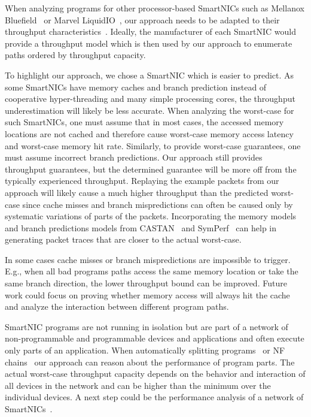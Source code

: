 \documentclass[sigconf,screen,authordraft]{acmart}
\newcommand{\Eg}{E.g.,}
\newcommand{\afblock}[1]{\noindent{\textbf{#1.}}}
\begin{document}
\afblock{Other SmartNICs}
When analyzing programs for other processor-based SmartNICs such as Mellanox Bluefield~\cite{bluefield} or Marvel LiquidIO~\cite{liquidio}, our approach needs to be adapted to their throughput characteristics~\cite{mellanox-performance}.
Ideally, the manufacturer of each SmartNIC would provide a throughput model which is then used by our approach to enumerate paths ordered by throughput capacity.

To highlight our approach, we chose a SmartNIC which is easier to predict.
As some SmartNICs have memory caches and branch prediction instead of cooperative hyper-threading and many simple processing cores, the throughput underestimation will likely be less accurate.
When analyzing the worst-case for such SmartNICs, one must assume that in most cases, the accessed memory locations are not cached and therefore cause worst-case memory access latency and worst-case memory hit rate.
Similarly, to provide worst-case guarantees, one must assume incorrect branch predictions.
Our approach still provides throughput guarantees, but the determined guarantee will be more off from the typically experienced throughput.
Replaying the example packets from our approach will likely cause a much higher throughput than the predicted worst-case since cache misses and branch mispredictions can often be caused only by systematic variations of parts of the packets.
Incorporating the memory models and branch predictions models from CASTAN~\cite{castan} and SymPerf~\cite{symperf} can help in generating packet traces that are closer to the actual worst-case.

In some cases cache misses or branch mispredictions are impossible to trigger.
\Eg{} when all bad programs paths access the same memory location or take the same branch direction, the lower throughput bound can be improved.
Future work could focus on proving whether memory access will always hit the cache and analyze the interaction between different program paths.

\afblock{Network Analysis}
SmartNIC programs are not running in isolation but are part of a network of non-programmable and programmable devices and applications and often execute only parts of an application.
When automatically splitting programs~\cite{flightplan} or NF chains~\cite{lemur} our approach can reason about the performance of program parts.
The actual worst-case throughput capacity depends on the behavior and interaction of all devices in the network and can be higher than the minimum over the individual devices.
A next step could be the performance analysis of a network of SmartNICs~\cite{network-optimization}.
\end{document}
